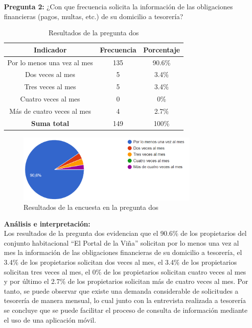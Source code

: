 \textbf{Pregunta 2:} ¿Con que frecuencia solicita la información de las obligaciones financieras (pagos, multas, etc.) de su domicilio a tesorería?
    \begin{table}[H]
              \centering
              \caption{Resultados de la pregunta dos}
              \begin{tabular}{|c|c|c|}
                  \hline
                  \textbf{Indicador} & \textbf{Frecuencia} &  \textbf{Porcentaje} \\
                  \hline
                  Por lo menos una vez al mes & 135 & 90.6\% \\
                  \hline
                  Dos veces al mes & 5 & 3.4\% \\
                  \hline
                  Tres veces al mes
                  & 5 & 3.4\% \\
                  \hline
                  Cuatro veces al mes & 0 & 0\% \\
                  \hline
                  Más de cuatro veces al mes & 4 & 2.7\% \\
                  \hline
                  \textbf{Suma total} & 149 & 100\% \\
                  \hline
              \end{tabular}\label{tab:table_preg_2}
    \end{table}
    \begin{figure}[H]
              \centering
              \includegraphics[width=0.8\textwidth]{resources/images/p2}
              \caption{Resultados de la encuesta en la pregunta dos}\label{fig:figure_p2}
    \end{figure}

\textbf{Análisis e interpretación:}\\
Los resultados de la pregunta dos evidencian que el 90.6\% de los propietarios del conjunto habitacional {\textquotedblleft}El Portal de la Viña{\textquotedblright} solicitan por lo menos una vez al mes la información de las obligaciones financieras de su domicilio a tesorería, el 3.4\% de los propietarios solicitan dos veces al mes, el 3.4\% de los propietarios solicitan tres veces al mes, el 0\% de los propietarios solicitan cuatro veces al mes y por último el 2.7\% de los propietarios solicitan más de cuatro veces al mes.
Por tanto, se puede observar que existe una demanda considerable de solicitudes a tesorería de manera mensual, lo cual junto con la entrevista realizada a tesorería se concluye que se puede facilitar el proceso de consulta de información mediante el uso de una aplicación móvil.


